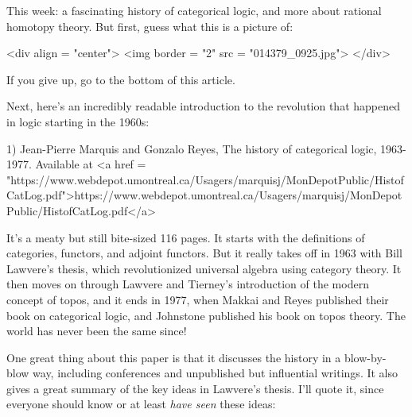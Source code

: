 

This week: a fascinating history of categorical logic, and more about
rational homotopy theory.  But first, guess what this is a picture of:

<div align = "center">
<img border = "2" src = "014379_0925.jpg">
</div>

If you give up, go to the bottom of this article.

Next, here's an incredibly readable introduction to the revolution
that happened in logic starting in the 1960s:

1) Jean-Pierre Marquis and Gonzalo Reyes, The history of categorical
logic, 1963-1977.  Available at
<a href = "https://www.webdepot.umontreal.ca/Usagers/marquisj/MonDepotPublic/HistofCatLog.pdf">https://www.webdepot.umontreal.ca/Usagers/marquisj/MonDepotPublic/HistofCatLog.pdf</a>

It's a meaty but still bite-sized 116 pages.  It starts with the
definitions of categories, functors, and adjoint functors.  But it
really takes off in 1963 with Bill Lawvere's thesis, which
revolutionized universal algebra using category theory.  It then moves
on through Lawvere and Tierney's introduction of the modern concept of
topos, and it ends in 1977, when Makkai and Reyes published their book
on categorical logic, and Johnstone published his book on topos theory.
The world has never been the same since!

One great thing about this paper is that it discusses the history in a
blow-by-blow way, including conferences and unpublished but
influential writings.  It also gives a great summary of the key ideas
in Lawvere's thesis.  I'll quote it, since everyone should know or at
least \emph{have seen} these ideas:

